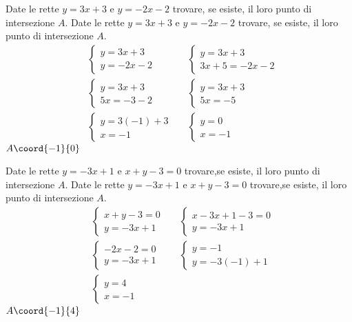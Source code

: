 \begin{exercise}
Date le rette $y=3x+3$ e $y=-2x-2$ trovare, se esiste, il loro punto di intersezione $A$.
\tcblower
Date le rette $y=3x+3$ e $y=-2x-2$ trovare, se esiste, il loro punto di intersezione $A$.
\begin{align*}
&\begin{cases}
y=3x+3\\
y=-2x-2
\end{cases}
&&\begin{cases}
y=3x+3\\
3x+5=-2x-2
\end{cases}\\
&\begin{cases}
y=3x+3\\
5x=-3-2
\end{cases}
&&\begin{cases}
y=3x+3\\
5x=-5
\end{cases}\\
&\begin{cases}
y=3(-1)+3\\
x=-1
\end{cases}
&&\begin{cases}
y=0\\
x=-1
\end{cases}
\end{align*}
	$A\coord{-1}{0}$
		\begin{center}
		
		\end{center}
\end{exercise}
\begin{exercise}
Date le rette $y=-3x+1$ e $x+y-3=0$ trovare,se esiste, il loro punto di intersezione $A$. 
\tcblower
Date le rette $y=-3x+1$ e $x+y-3=0$ trovare,se esiste, il loro punto di intersezione $A$.
\begin{align*}
&\begin{cases}
x+y-3=0\\
y=-3x+1
\end{cases}
&&\begin{cases}
x-3x+1-3=0\\
y=-3x+1
\end{cases}\\
&\begin{cases}
-2x-2=0\\
y=-3x+1
\end{cases}
&&\begin{cases}
y=-1\\
y=-3(-1)+1
\end{cases}\\
&\begin{cases}
y=4\\
x=-1
\end{cases}
\end{align*}
$A\coord{-1}{4}$
\begin{center}
	
\end{center}
\end{exercise}
